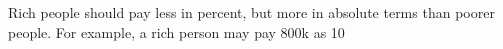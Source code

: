 Rich people should pay less in percent, but more in absolute terms than poorer people. For example, a rich person may pay 800k as 10%

